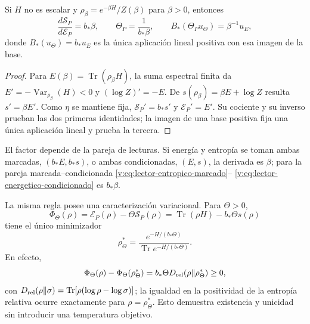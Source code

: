 \begin{theorem}
\label{v:thm:derivada-termometrica-marcada}
Si $H$ no es escalar y
$\rho_\beta=e^{-\beta H}/Z(\beta)$ para $\beta>0$, entonces
\begin{equation}
 \frac{d\mathcal S_P}{d\mathcal E_P}=b_*\beta,
 \qquad \Theta_P=\frac1{b_*\beta},
 \qquad B_*(\Theta_Pu_\Theta)=\beta^{-1}u_E,
 \label{v:eq:derivada-termometrica-marcada}
\end{equation}
donde $B_*(u_\Theta)=b_*u_E$ es la única aplicación lineal positiva con esa
imagen de la base.
\end{theorem}
\begin{proof}
Para $E(\beta)=\operatorname{Tr}(\rho_\beta H)$, la suma espectral finita
da $E'=-\operatorname{Var}_{\rho_\beta}(H)<0$ y
$(\log Z)'=-E$. De
$s(\rho_\beta)=\beta E+\log Z$ resulta $s'=\beta E'$. Como $\eta$ se
mantiene fija,
$\mathcal S_P'=b_*s'$ y $\mathcal E_P'=E'$. Su cociente y su inverso
prueban las dos primeras identidades; la imagen de una base positiva fija
una única aplicación lineal y prueba la tercera.
\end{proof}

El factor depende de la pareja de lecturas. Si energía y entropía se toman
ambas marcadas, $(b_*E,b_*s)$, o ambas condicionadas, $(E,s)$, la derivada
es $\beta$; para la pareja marcada--condicionada
\eqref{v:eq:lector-entropico-marcado}--
\eqref{v:eq:lector-energetico-condicionado} es $b_*\beta$.

La misma regla posee una caracterización variacional. Para $\Theta>0$,
\begin{equation}
 \Phi_\Theta(\rho)=\mathcal E_P(\rho)-\Theta\mathcal S_P(\rho)
 =\operatorname{Tr}(\rho H)-b_*\Theta s(\rho)
 \label{v:eq:funcional-variacional-marcado}
\end{equation}
tiene el único minimizador
\begin{equation}
 \rho_\Theta^*=\frac{e^{-H/(b_*\Theta)}}
                    {\operatorname{Tr}e^{-H/(b_*\Theta)}}.
 \label{v:eq:minimo-variacional-marcado}
\end{equation}
En efecto,
\[
 \Phi_\Theta(\rho)-\Phi_\Theta(\rho_\Theta^*)
 =b_*\Theta D_{\rm rel}(\rho\Vert\rho_\Theta^*)\ge0,
\]
con
$D_{\rm rel}(\rho\Vert\sigma)
=\operatorname{Tr}[\rho(\log\rho-\log\sigma)]$; la igualdad en la
positividad de la entropía relativa ocurre exactamente
para $\rho=\rho_\Theta^*$. Esto demuestra existencia y unicidad sin
introducir una temperatura objetivo.

